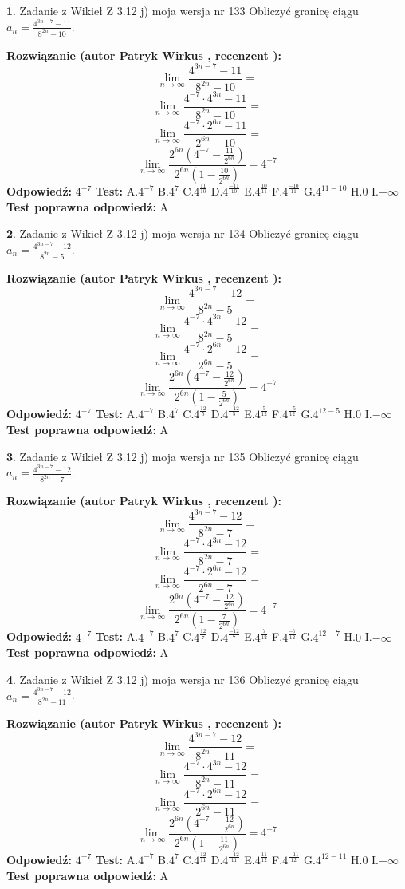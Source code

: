 \documentclass[12pt, a4paper]{article}
\theoremstyle{definition} %
\newtheorem{zad}{}
\newcommand{\zadStart}[1]{\begin{zad}#1\newline}
\newcommand{\zadStop}{\end{zad}}
\newcommand{\rozwStart}[2]{\noindent \textbf{Rozwiązanie (autor #1 , recenzent #2): }\newline}
\newcommand{\rozwStop}{\newline}
\newcommand{\odpStart}{\noindent \textbf{Odpowiedź:}\newline}
\newcommand{\odpStop}{\newline}
\newcommand{\testStart}{\noindent \textbf{Test:}\newline}
\newcommand{\testStop}{\newline}
\newcommand{\kluczStart}{\noindent \textbf{Test poprawna odpowiedź:}\newline}
\newcommand{\kluczStop}{\newline}
\begin{document}
\zadStart{Zadanie z Wikieł Z 3.12 j) moja wersja nr 133}
Obliczyć granicę ciągu $a_{n}=\frac{4^{3n-7}-11}{8^{2n}-10}$.
\zadStop
\rozwStart{Patryk Wirkus}{}
$$\lim\limits_{n\to\infty}\frac{4^{3n-7}-11}{8^{2n}-10}=$$
$$\lim\limits_{n\to\infty}\frac{4^{-7} \cdot 4^{3n}-11}{8^{2n}-10}=$$
$$\lim\limits_{n\to\infty}\frac{4^{-7} \cdot 2^{6n}-11}{2^{6n}-10}=$$
$$\lim\limits_{n\to\infty}\frac{2^{6n}(4^{-7} - \frac{11}{2^{6n}})}{2^{6n}(1-\frac{10}{2^{6n}})}= 4^{-7}$$
\rozwStop
\odpStart
$4^{-7}$
\odpStop
\testStart
A.$4^{-7}$
B.$4^{7}$
C.$4^{\frac{11}{10}}$
D.$4^{\frac{-11}{10}}$
E.$4^{\frac{10}{11}}$
F.$4^{\frac{-10}{11}}$
G.$4^{11-10}$
H.$0$
I.$-\infty$
\testStop
\kluczStart
A
\kluczStop



\zadStart{Zadanie z Wikieł Z 3.12 j) moja wersja nr 134}
Obliczyć granicę ciągu $a_{n}=\frac{4^{3n-7}-12}{8^{2n}-5}$.
\zadStop
\rozwStart{Patryk Wirkus}{}
$$\lim\limits_{n\to\infty}\frac{4^{3n-7}-12}{8^{2n}-5}=$$
$$\lim\limits_{n\to\infty}\frac{4^{-7} \cdot 4^{3n}-12}{8^{2n}-5}=$$
$$\lim\limits_{n\to\infty}\frac{4^{-7} \cdot 2^{6n}-12}{2^{6n}-5}=$$
$$\lim\limits_{n\to\infty}\frac{2^{6n}(4^{-7} - \frac{12}{2^{6n}})}{2^{6n}(1-\frac{5}{2^{6n}})}= 4^{-7}$$
\rozwStop
\odpStart
$4^{-7}$
\odpStop
\testStart
A.$4^{-7}$
B.$4^{7}$
C.$4^{\frac{12}{5}}$
D.$4^{\frac{-12}{5}}$
E.$4^{\frac{5}{12}}$
F.$4^{\frac{-5}{12}}$
G.$4^{12-5}$
H.$0$
I.$-\infty$
\testStop
\kluczStart
A
\kluczStop



\zadStart{Zadanie z Wikieł Z 3.12 j) moja wersja nr 135}
Obliczyć granicę ciągu $a_{n}=\frac{4^{3n-7}-12}{8^{2n}-7}$.
\zadStop
\rozwStart{Patryk Wirkus}{}
$$\lim\limits_{n\to\infty}\frac{4^{3n-7}-12}{8^{2n}-7}=$$
$$\lim\limits_{n\to\infty}\frac{4^{-7} \cdot 4^{3n}-12}{8^{2n}-7}=$$
$$\lim\limits_{n\to\infty}\frac{4^{-7} \cdot 2^{6n}-12}{2^{6n}-7}=$$
$$\lim\limits_{n\to\infty}\frac{2^{6n}(4^{-7} - \frac{12}{2^{6n}})}{2^{6n}(1-\frac{7}{2^{6n}})}= 4^{-7}$$
\rozwStop
\odpStart
$4^{-7}$
\odpStop
\testStart
A.$4^{-7}$
B.$4^{7}$
C.$4^{\frac{12}{7}}$
D.$4^{\frac{-12}{7}}$
E.$4^{\frac{7}{12}}$
F.$4^{\frac{-7}{12}}$
G.$4^{12-7}$
H.$0$
I.$-\infty$
\testStop
\kluczStart
A
\kluczStop



\zadStart{Zadanie z Wikieł Z 3.12 j) moja wersja nr 136}
Obliczyć granicę ciągu $a_{n}=\frac{4^{3n-7}-12}{8^{2n}-11}$.
\zadStop
\rozwStart{Patryk Wirkus}{}
$$\lim\limits_{n\to\infty}\frac{4^{3n-7}-12}{8^{2n}-11}=$$
$$\lim\limits_{n\to\infty}\frac{4^{-7} \cdot 4^{3n}-12}{8^{2n}-11}=$$
$$\lim\limits_{n\to\infty}\frac{4^{-7} \cdot 2^{6n}-12}{2^{6n}-11}=$$
$$\lim\limits_{n\to\infty}\frac{2^{6n}(4^{-7} - \frac{12}{2^{6n}})}{2^{6n}(1-\frac{11}{2^{6n}})}= 4^{-7}$$
\rozwStop
\odpStart
$4^{-7}$
\odpStop
\testStart
A.$4^{-7}$
B.$4^{7}$
C.$4^{\frac{12}{11}}$
D.$4^{\frac{-12}{11}}$
E.$4^{\frac{11}{12}}$
F.$4^{\frac{-11}{12}}$
G.$4^{12-11}$
H.$0$
I.$-\infty$
\testStop
\kluczStart
A
\kluczStop
\end{document}
